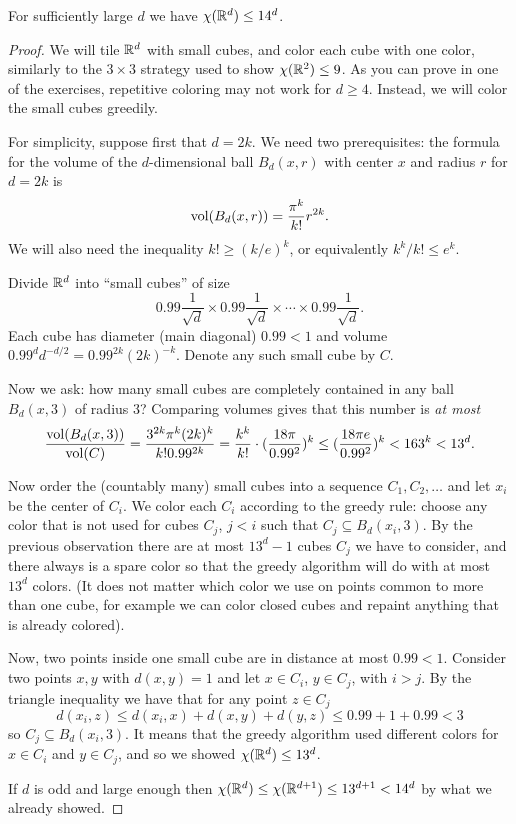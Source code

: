 \begin{theorem}
For sufficiently large $d$ we have $\chi(\mathbb{R}^d)\leq 14^d$.
\end{theorem}
\begin{proof}
We will tile $\mathbb{R}^d$ with small cubes, and color each cube with one color, similarly to the $3\times 3$ strategy used to show $\chi(\mathbb{R}^2)\leq 9$. As you can prove in one of the exercises, repetitive coloring may not work for $d\geq 4$. Instead, we will color the small cubes greedily.

For simplicity, suppose first that $d=2k$. We need two prerequisites: the formula for the volume of the $d$-dimensional ball $B_d(x,r)$ with center $x$ and radius $r$ for $d=2k$ is
$$\mathrm{vol}(B_d(x,r)) = \frac{\pi^k}{k!}r^{2k}.$$
We will also need the inequality $k!\geq(k/e)^k$, or equivalently $k^k/k!\leq e^k$.

Divide $\mathbb{R}^d$ into ``small cubes'' of size
$$0.99\frac{1}{\sqrt{d}}\times 0.99\frac{1}{\sqrt{d}}\times\cdots\times 0.99\frac{1}{\sqrt{d}}.$$
Each cube has diameter (main diagonal) $0.99<1$ and volume $0.99^dd^{-d/2}=0.99^{2k}(2k)^{-k}$. Denote any such small cube by $C$.

Now we ask: how many small cubes are completely contained in any  ball $B_d(x,3)$ of radius $3$? Comparing volumes gives that this number is \emph{at most}
\begin{align*}
\frac{\mathrm{vol}(B_d(x,3))}{\mathrm{vol}(C)} = \frac{3^{2k}\pi^k(2k)^k}{k!0.99^{2k}}=\frac{k^k}{k!}\cdot(\frac{18\pi}{0.99^2})^k\leq (\frac{18\pi e}{0.99^2})^k<163^k<13^d.
\end{align*}

Now order the (countably many) small cubes into a sequence $C_1,C_2,\ldots$ and let $x_i$ be the center of $C_i$. We color each $C_i$ according to the greedy rule: choose any color that is not used for cubes $C_j$, $j<i$ such that $C_j\subseteq B_d(x_i,3)$. By the previous observation there are at most $13^d-1$ cubes $C_j$ we have to consider, and there always is a spare color so that the greedy algorithm will do with at most $13^d$ colors. (It does not matter which color we use on points common to more than one cube, for example we can color closed cubes and repaint anything that is already colored).

Now, two points inside one small cube are in distance at most $0.99<1$. Consider two points $x,y$ with $d(x,y)=1$ and let $x\in C_i$, $y\in C_j$, with $i>j$. By the triangle inequality we have that for any point $z\in C_j$ 
$$d(x_i,z)\leq d(x_i,x)+d(x,y)+d(y,z)\leq 0.99+1+0.99<3$$
so $C_j\subseteq B_d(x_i,3)$. It means that the greedy algorithm used different colors for $x\in C_i$ and $y\in C_j$, and so we showed $\chi(\mathbb{R}^d)\leq 13^d$.

If $d$ is odd and large enough then $\chi(\mathbb{R}^d)\leq \chi(\mathbb{R}^{d+1})\leq 13^{d+1}<14^d$ by what we already showed.
\end{proof}


